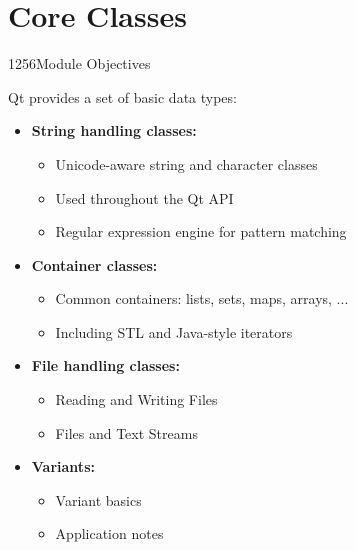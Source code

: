 %
%
%
%

\section{Core Classes}

\begin{slide}{1256}{Module Objectives}
\label{basic-types}

Qt provides a set of basic data types:

\begin{itemize}
    \item \textbf{String handling classes:}
      \begin{itemize}
      \item Unicode-aware string and character classes
      \item Used throughout the Qt API
      \item Regular expression engine for pattern matching
      \end{itemize}
\item \textbf{Container classes:}
  \begin{itemize}
  \item Common containers: lists, sets, maps, arrays, ...
  \item Including STL and Java-style iterators
  \end{itemize}
\item \textbf{File handling classes:}
  \begin{itemize}
  \item Reading and Writing Files
  \item Files and Text Streams  
\end{itemize}
\item \textbf{Variants:}
  \begin{itemize}
  \item Variant basics
  \item Application notes
\end{itemize}

\end{itemize}

\end{slide}






